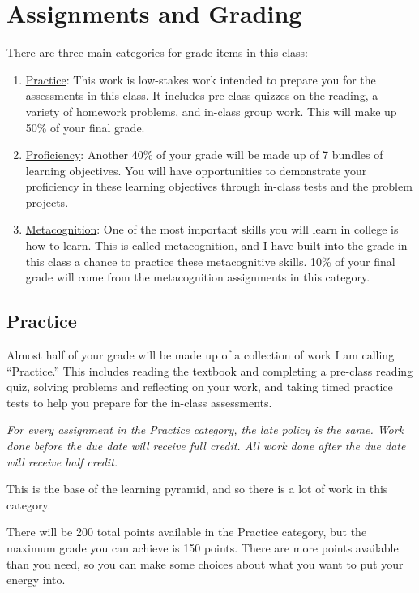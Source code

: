 \documentclass[
  letterpaper,
  DIV=11,
  numbers=noendperiod]{scrartcl}
\begin{document}
\section{Assignments and Grading}\label{assignments}

There are three main categories for grade items in this class:

\begin{enumerate}
\def\labelenumi{\arabic{enumi}.}
\item
  \hyperref[practicegrade]{Practice}: This work is low-stakes work
  intended to prepare you for the assessments in this class. It includes
  pre-class quizzes on the reading, a variety of homework problems, and
  in-class group work. This will make up 50\% of your final grade.
\item
  \hyperref[LOgrade]{Proficiency}: Another 40\% of your grade will be
  made up of 7 bundles of learning objectives. You will have
  opportunities to demonstrate your proficiency in these learning
  objectives through in-class tests and the problem projects.
\item
  \hyperref[metacognitiongrade]{Metacognition}: One of the most
  important skills you will learn in college is how to learn. This is
  called metacognition, and I have built into the grade in this class a
  chance to practice these metacognitive skills. 10\% of your final
  grade will come from the metacognition assignments in this category.
\end{enumerate}

\subsection{Practice}\label{practicegrade}

Almost half of your grade will be made up of a collection of work I am
calling ``Practice.'' This includes reading the textbook and completing
a pre-class reading quiz, solving problems and reflecting on your work,
and taking timed practice tests to help you prepare for the in-class
assessments.

\emph{For every assignment in the Practice category, the late policy is
the same. Work done before the due date will receive full credit. All
work done after the due date will receive half credit.}

This is the base of the learning pyramid, and so there is a lot of work
in this category.

There will be 200 total points available in the Practice category, but
the maximum grade you can achieve is 150 points. There are more points
available than you need, so you can make some choices about what you
want to put your energy into.
\end{document}
